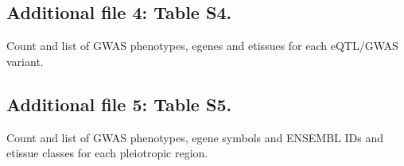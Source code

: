 \documentclass{bmcart}
\begin{document}
\begin{backmatter}
        \subsection*{Additional file 4: Table S4.}
        Count and list of GWAS phenotypes, egenes and etissues for each eQTL/GWAS variant.

        \subsection*{Additional file 5: Table S5.}
        Count and list of GWAS phenotypes, egene symbols and ENSEMBL IDs and etissue classes for each pleiotropic region.

    \end{backmatter}
\end{document}
